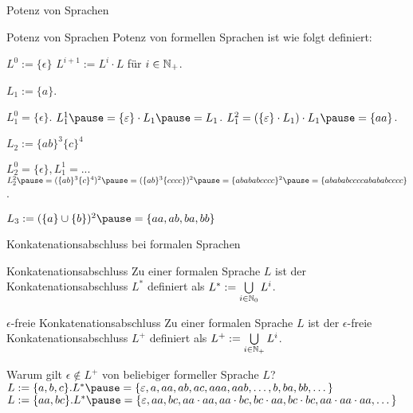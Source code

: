 \begin{frame}{Potenz von Sprachen}
	
	\begin{block}{Potenz von Sprachen}
		Potenz von formellen Sprachen ist wie folgt definiert:
		\begin{itemize}
			\pitem $L^0 := \{\epsilon\}$
			\pitem $L^{i+1} := L^i \cdot L$ für $i \in \mathbb{N}_+$.
		\end{itemize}
	\end{block}

	\begin{itemize}
		\pitem $L_1 := \{a\}$.
		\begin{itemize}
			\pitem $L_1^0 = \{\epsilon\}$. \pause $L_1^1 \pause = \{\epsilon\} \cdot L_1 \pause = L_1$.
			\pitem $L_1^2 = (\{\epsilon\} \cdot L_1) \cdot L_1 \pause = \{aa\}$.
		\end{itemize}
		\pitem $L_2 := \{ab\}^3\{c\}^4$
		\begin{itemize}
			\pitem $L_2^0 = \{\epsilon\}, L_1^1 = ...$
			\pitem $L_2^2 \pause = (\{ab\}^3\{c\}^4)^2 \pause = (\{ab\}^3\{cccc\})^2 \pause = \{abababcccc\}^2 \pause = \{abababccccabababcccc\}$.
		\end{itemize}
		\pitem $L_3 := (\{a\} \cup \{b\})^2 \pause = \{aa, ab, ba, bb\}$
	\end{itemize}

\end{frame}

\begin{frame}{Konkatenationsabschluss bei formalen Sprachen}
	\p
	\begin{block}{Konkatenationsabschluss}
		Zu einer formalen Sprache $L$ \pause ist der Konkatenationsabschluss $L^*$ definiert \pause als $L^* := \bigcup\limits_{i \in \mathbb{N}_0} L^i$.
	\end{block}
	\p
	\begin{block}{$\epsilon$-freie Konkatenationsabschluss}
		Zu einer formalen Sprache $L$ \pause ist der $\epsilon$-freie Konkatenationsabschluss $L^+$ definiert \pause als $L^+ := \bigcup\limits_{i \in \mathbb{N}_+} L^i$.
	\end{block}

	\begin{itemize}
		\pitem Warum gilt $\epsilon \notin L^+$ von beliebiger formeller Sprache $L$?
		\pitem $L := \{a, b, c\}.  L^* \pause = \{\epsilon, a, aa, ab, ac, aaa, aab, \dots, b, ba, bb, \dots \}$
		\pitem $L := \{aa, bc\}.  L^* \pause = \{\epsilon, aa, bc, aa\cdot aa, aa\cdot bc, bc \cdot aa, bc \cdot bc, aa \cdot aa \cdot aa, \dots \}$
	\end{itemize}
\end{frame}

